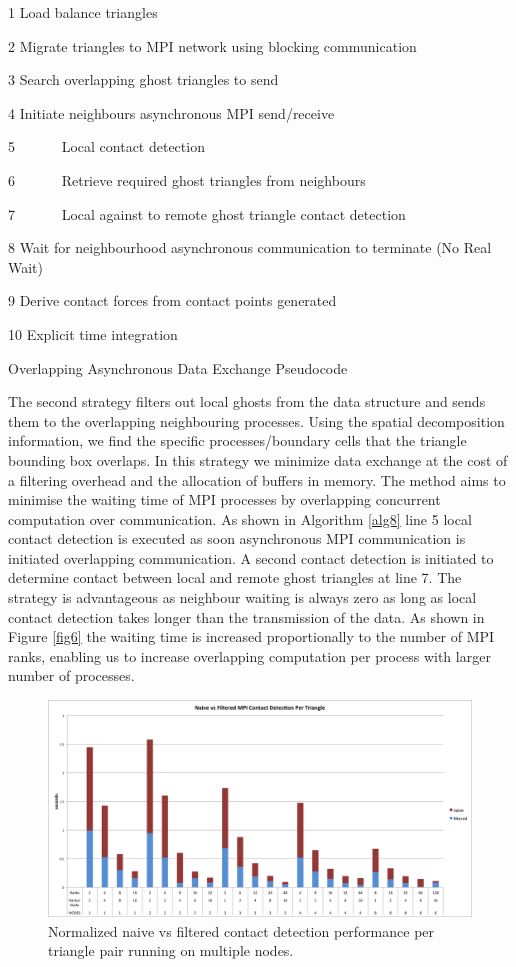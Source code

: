 \documentclass[times,12pt]{article}
\begin{document}
\begin{algorithm}
1 Load balance triangles

2 Migrate triangles to MPI network using blocking communication

3 Search overlapping ghost triangles to send

4 Initiate neighbours asynchronous MPI send/receive

5 ~~~~~~Local contact detection

6 ~~~~~~Retrieve required ghost triangles from neighbours

7 ~~~~~~Local against to remote ghost triangle contact detection

8 Wait for neighbourhood asynchronous communication to terminate (No Real Wait)

9 Derive contact forces from contact points generated

10 Explicit time integration

\protect\caption{\label{alg8}Overlapping Asynchronous Data Exchange Pseudocode}
\end{algorithm}

The second strategy filters out local ghosts from the data structure and sends them to the overlapping neighbouring processes. Using the spatial decomposition information, we find the specific processes/boundary cells that the triangle bounding box overlaps. In this strategy we minimize data exchange at the cost of a filtering overhead and the allocation of buffers in memory. The method aims to minimise the waiting time of MPI processes by overlapping concurrent computation over communication. As shown in Algorithm \ref{alg8} line 5 local contact detection is executed as soon asynchronous MPI communication is initiated overlapping communication. A second contact detection is initiated to determine contact between local and remote ghost triangles at line 7. The strategy is advantageous as neighbour waiting is always zero as long as local contact detection takes longer than the transmission of the data. As shown in Figure \ref{fig6} the waiting time is increased proportionally to the number of MPI ranks, enabling us to increase overlapping computation per process with larger number of processes.

\begin{figure}[!h]
\centering
\includegraphics[width=1\textwidth]{mpi} \protect\caption{\label{fig7}Normalized naive vs filtered contact detection performance per triangle pair running on multiple nodes.}
\end{figure}
\end{document}
